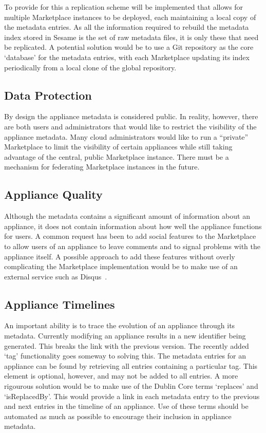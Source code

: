 To provide for this a replication scheme will be implemented that  
allows for multiple Marketplace instances to be deployed, each maintaining a 
local copy of the metadata entries. As all the information required 
to rebuild the metadata index stored in Sesame is the set of raw metadata 
files, it is only these that need be replicated.  A potential solution would 
be to use a Git repository as the core `database' for the
metadata entries, with each Marketplace updating its index 
periodically from a local clone of the global repository.

\subsection{Data Protection}

By design the appliance metadata is considered public.  In reality,
however, there are both users and administrators that would like to
restrict the visibility of the appliance metadata.  Many cloud
administrators would like to run a ``private'' Marketplace to limit
the visibility of certain appliances while still taking advantage of
the central, public Marketplace instance.  There must be a mechanism
for federating Marketplace instances in the future. 

\subsection{Appliance Quality}

Although the metadata contains a significant amount of information
about an appliance, it does not contain information about how well the
appliance functions for users.  A common request has been to add
social features to the Marketplace to allow users of an appliance
to leave comments and to signal problems with the appliance itself.  
A possible approach to add these features without overly complicating 
the Marketplace implementation would be to make use of an external service 
such as Disqus~\cite{disqus}.

\subsection{Appliance Timelines}

An important ability is to trace the evolution of an appliance through its
metadata. Currently modifying an appliance results in a new identifier 
being generated. This breaks the link with the previous version. The recently added 
`tag' functionality goes someway to solving this.  The metadata entries for 
an appliance can be found by retrieving all entries
containing a particular tag. This element is optional, however, and
may not be added to all entries. A more rigourous solution would be to
make use of the Dublin Core terms `replaces' and `isReplacedBy'. This
would provide a link in each metadata entry to the previous and next
entries in the timeline of an appliance. Use of these terms should be 
automated as much as possible to encourage their inclusion in appliance metadata.
